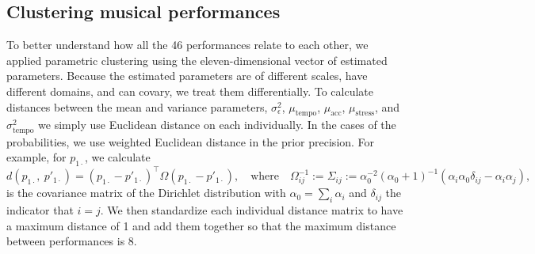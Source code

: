\documentclass[aoas]{imsart}
\begin{document}
\subsection{Clustering musical performances}
\label{sec:clust-music-perf}

To better understand how all the 46 performances relate to each other,
we applied parametric clustering using the eleven-dimensional vector
of estimated parameters. Because the estimated parameters are of
different scales, have different domains, and can covary, we treat
them differentially. To calculate distances between the mean and
variance parameters, $\sigma^2_\epsilon$, $\mu_{\textrm{tempo}}$,
$\mu_{\textrm{acc}}$, $\mu_{\textrm{stress}}$, and
$\sigma^2_{\textrm{tempo}}$ we simply use Euclidean distance on each
individually. In the cases of the probabilities, we use weighted
Euclidean distance in the prior precision. For example, for
$p_{1\cdot}$, we calculate
\begin{equation}
d\left(p_{1\cdot},\ p'_{1\cdot}\right) = (p_{1\cdot}-p'_{1\cdot})^\top
  \Omega (p_{1\cdot}-p'_{1\cdot}),\quad
\textrm{where}
  \quad\Omega^{-1}_{ij} := \Sigma_{ij} :=
  \alpha_0^{-2}(\alpha_0+1)^{-1}\left(\alpha_i\alpha_0 \delta_{ij}
    - \alpha_i\alpha_j\right),
\end{equation}
is the covariance matrix of the Dirichlet distribution with
$\alpha_0=\sum_i\alpha_i$ and $\delta_{ij}$ the indicator that
$i=j$. We then standardize each individual distance matrix to have a
maximum distance of 1 and add them together so that the maximum distance
between performances is 8.
\end{document}
